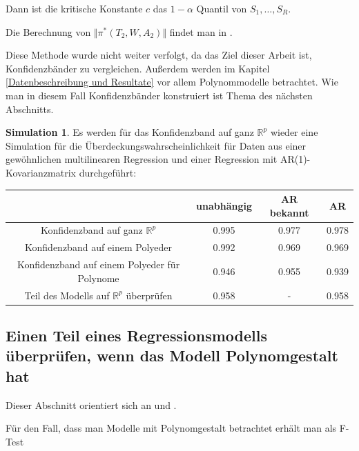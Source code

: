 \documentclass[12pt,a4paper]{article}
\theoremstyle{definition}
\theoremstyle{definition}
\theoremstyle{definition}
\newtheorem{Simulation}[Definition]{Simulation}
\theoremstyle{definition}
\newcommand{\UeberRR}{0.995}
\newcommand{\UeberRMinmax}{0.992}
\newcommand{\UeberRMinmaxPolyfast}{0.946}
\newcommand{\UeberARbekanntR}{0.977}
\newcommand{\UeberARbekanntMinmax}{0.969}
\newcommand{\UeberARbekanntMinmaxPolyfast}{0.955}
\newcommand{\UeberARR}{0.978}
\newcommand{\UeberARMinmax}{0.969}
\newcommand{\UeberARMinmaxPolyfast}{0.939}
\newcommand{\UeberRRpruefen}{0.958}
\newcommand{\UeberARRpruefen}{0.958}
\begin{document}
Dann ist die kritische Konstante $c$ das $1-\alpha$ Quantil von $S_1, \ldots, S_R$.

Die Berechnung von $\Vert \pi^{*}(T_2,W,A_2) \Vert$ findet man in \cite[Appendix B]{Liu64}.

Diese Methode wurde nicht weiter verfolgt, da das Ziel dieser Arbeit ist, Konfidenzbänder zu vergleichen. Außerdem werden im Kapitel \ref{Datenbeschreibung und Resultate} vor allem Polynommodelle betrachtet. Wie man in diesem Fall Konfidenzbänder konstruiert ist Thema des nächsten Abschnitts.

\begin{Simulation}
Es werden für das Konfidenzband auf ganz $\mathbb{R}^{p}$ wieder eine Simulation für die Überdeckungswahrscheinlichkeit für Daten aus einer gewöhnlichen multilinearen Regression und einer Regression mit AR(1)-Kovarianzmatrix durchgeführt:


\begin{center}
\begin{tabular}{|c|c|c|c|}
\hline 
 & unabhängig & AR bekannt & AR \\ 
\hline 
Konfidenzband auf ganz $\mathbb{R}^{p}$		 & \UeberRR		  & \UeberARbekanntR & \UeberARR \\ 
\hline 
Konfidenzband auf einem Polyeder	 & \UeberRMinmax  & \UeberARbekanntMinmax & \UeberARMinmax \\ 
\hline 
Konfidenzband auf einem Polyeder für Polynome  & \UeberRMinmaxPolyfast & \UeberARbekanntMinmaxPolyfast & \UeberARMinmaxPolyfast \\ 
\hline 
 Teil des Modells auf $\mathbb{R}^{p}$ überprüfen 	& \UeberRRpruefen & - & \UeberARRpruefen \\ 
\hline 
\end{tabular} 
\end{center}

\end{Simulation}



\subsection{Einen Teil eines Regressionsmodells überprüfen, wenn das Modell Polynomgestalt hat}
\label{Teil eines Regressionsmodells überpruefen, wenn das Modell Polynomgestalt hat}
Dieser Abschnitt orientiert sich an \cite[190-192]{Liu64} und \cite{Draper98}.

Für den Fall, dass man Modelle mit Polynomgestalt betrachtet erhält man als F-Test
\end{document}
